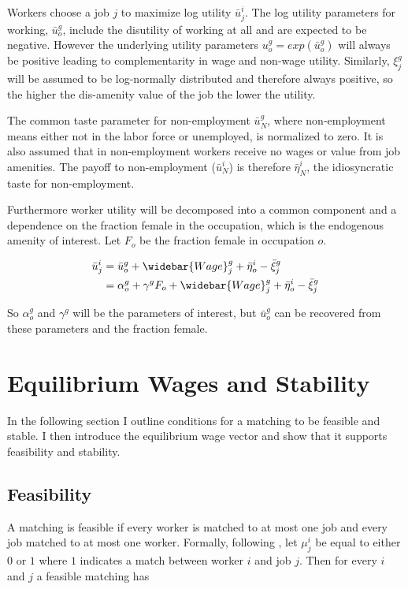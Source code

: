 \documentclass[11pt]{article}
\begin{document}
Workers choose a job $j$ to maximize log utility $\bar{u}^{i}_j$.  The log utility parameters for working, $\bar{u}^g_o$, include the disutility of working at all and are expected to be negative. However the underlying utility parameters $u^g_o = exp(\bar{u}^g_o)$ will always be positive leading to complementarity in wage and non-wage utility. Similarly, ${\xi^g_j}$ will be assumed to be log-normally distributed and therefore always positive, so the higher the dis-amenity value of the job the lower the utility. 

The common taste parameter for non-employment $\bar{u}^g_N$, where non-employment means either not in the labor force or unemployed, is normalized to zero. It is also assumed that in non-employment workers receive no wages or value from job amenities. The payoff to non-employment ($\bar{u}^i_N$) is therefore  $ \bar{\eta}^i_N $, the idiosyncratic taste for non-employment.

Furthermore worker utility will be decomposed into a common component and a dependence on the fraction female in the occupation, which is the endogenous amenity of interest. Let $F_o$ be the fraction female in occupation $o$.

\begin{align*}
\bar{u}^{i}_j &= \bar{u}^{g}_o + \widebar{Wage}^g_j   + \bar{\eta}^i_o - \bar{\xi}^g_j \\
    &= \alpha^g_o +   \gamma^g F_o + \widebar{Wage}^g_j   + \bar{\eta}^i_o - \bar{\xi}^g_j
\end{align*}

So $\alpha^g_o$ and  $\gamma^g$ will be the parameters of interest, but $\bar{u}^{g}_o $ can be recovered from these parameters and the fraction female.

\section{Equilibrium Wages and Stability} \label{equilibrium}
In the following section I outline conditions for a matching to be feasible and stable. I then introduce the equilibrium wage vector and show that it supports feasibility and stability.

\subsection{Feasibility}
A matching is feasible if every worker is matched to at most one job and every job matched to at most one worker. Formally, following , let $\mu^i_j$ be equal to either $0$ or $1$ where $1$ indicates a match between worker $i$ and job $j$. Then for every $i$ and $j$ a feasible matching has
\end{document}
